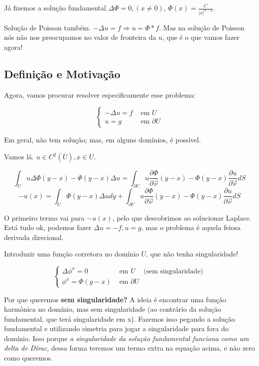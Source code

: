\documentclass[11pt]{article}
\newcommand{\p}{\partial}
\newcommand{\pde}[2]{\frac{\p #1}{\p #2}}
\newcommand{\dirdev}[1]{\pde{#1}{\vec{\nu}}}
\begin{document}
Já fizemos a solução fundamental \(\Delta \Phi = 0, (x \neq 0)\), \(\Phi(x) = \frac{C}{|x|^{n-2}}\).

Solução de Poisson também. \(-\Delta u = f \Rightarrow u = \Phi * f\). Mas na solução de Poisson nós não nos preocupamos no valor de fronteira da \(u\), que é o que vamos fazer agora!

\subsection{Definição e Motivação}

Agora, vamos procurar resolver especificamente esse problema:

\begin{equation}\label{prob-laplaciano}
	\begin{cases}
		-\Delta u = f & \text{ em } U \\
		u = g & \text{ em } \p U
	\end{cases}
\end{equation}

Em geral, não tem solução; mas, em alguns domínios, é possível.

Vamos lá. \(u \in C^2 (\overline{U}), x \in U\).

\[ \int_U u \Delta \Phi (y-x) - \Phi (y-x) \Delta u = \int_{\partial U} u \dirdev{\Phi} (y-x) - \Phi (y-x) \dirdev{u} dS \]
\[ -u(x) = \int_U \Phi (y-x) \Delta u dy + \int_{\partial U} u \dirdev{\Phi} (y-x) - \Phi (y-x) \dirdev{u} dS  \]

O primeiro termo vai para \(-u(x)\), pelo que descobrimos ao solucionar Laplace. Está tudo ok, podemos fazer \(\Delta u = -f, u=g\), mas o problema é aquela feiosa derivada direcional.

Introduzir uma função corretora no domínio \(U\), que não tenha singularidade!

\[
\begin{cases}
	\Delta \phi^x= 0 & \text{ em } U\;\;\; \text{ (sem singularidade)}\\
	\phi^x = \Phi(y-x) & \text{ em } \p U
\end{cases}
\]

Por que queremos \textbf{sem singularidade?} A ideia é encontrar uma função harmônica no domínio, mas sem singularidade (ao contrário da solução fundamental, que terá singularidade em x). Fazemos isso pegando a solução fundamental e utilizando simetria para jogar a singularidade para fora do domínio. Isso porque \textit{a singularidade da solução fundamental funciona como um delta de Dirac}, dessa forma teremos um termo extra na equação acima, e não zero como queremos.
\end{document}
